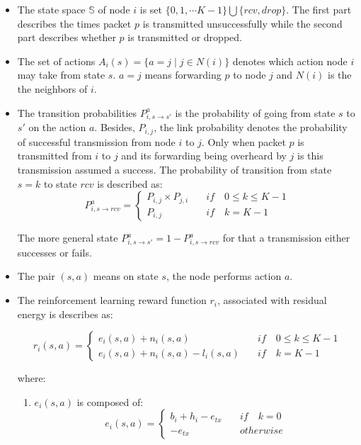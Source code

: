 \documentclass[10pt,twocolumn,letterpaper]{article}
\begin{document}
\begin{itemize}
	\item The state space $\mathbb{S}$ of node $i$ is set $\{0,1,\cdots K-1\} \bigcup \{rcv,drop\}$. The first part describes the times packet $p$ is transmitted unsuccessfully while the second part describes whether $p$ is transmitted or dropped.
	\item The set of actions $A_i(s)=\{a=j \mid j\in N(i)\}$ denotes which action node $i$ may take from state $s$. $a=j$ means forwarding $p$ to node $j$ and $N(i)$ is the the neighbors of $i$.  
	\item The transition probabilities $P_{i,s\to s'}^a$ is the probability of going from state $s$ to $s'$ on the action $a$. Besides, $P_{i,j}$, the link probability denotes the probability of successful transmission from node $i$ to $j$. Only when packet $p$ is transmitted from $i$ to $j$ and its forwarding being overheard by $j$ is this transmission assumed a success. The probability of transition from state $s=k$ to state $rcv$ is described as:
	\begin{equation*}
	P_{i,s\to rcv}^a= \begin{cases}
	P_{i,j}\times P_{j,i} & \quad if \quad 0\leq k \leq K-1  \\ 
	P_{i,j} & \quad if \quad k = K-1
	\end{cases}  
	\end{equation*}	
	
	The more general state $P_{i,s\to s'}^a=1-P_{i,s\to rcv}^a$ for that a transmission either successes or fails.
	\item The pair $(s,a)$ means on state $s$, the node performs action $a$.
	\item The reinforcement learning reward function $r_i$, associated with residual energy is describes as:
	\begin{footnotesize}
		\begin{equation*}
		r_i(s,a)= \begin{cases}
		e_i(s,a)+n_i(s,a)  \quad &if \quad0\leq k \leq K-1  \\ 
		e_i(s,a)+n_i(s,a)-l_i(s,a) \quad &if \quad  k = K-1
		\end{cases} 
		\end{equation*}	
	\end{footnotesize}
	where: 
	\begin{enumerate}
		\item $e_i(s,a)$ is composed of:
		\begin{equation*}
		e_i(s,a)=\begin{cases}
		b_i+h_i-e_{tx} & \quad if\quad  k=0  \\ 
		-e_{tx} & \quad otherwise
		\end{cases}  
		\end{equation*}	
		

\end{enumerate}
\end{itemize}
\end{document}

